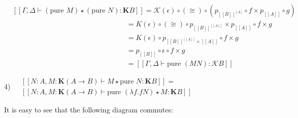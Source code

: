 \documentclass[a4paper]{article}
\begin{document}
\vspace{\baselineskip}

$\begin{array}{lll}
&[\![\Gamma, \Delta \vdash (\text{pure } M) \star (\text{pure } N) : \textbf{K}B]\!] =
\mathcal{K}(\epsilon) \circ (\cong) \circ (p_{[\![B]\!]^{\![A]\!}} \circ f \times p_{[\![A]\!]} \circ g) &\\
&\quad\quad\quad\quad\quad\quad\quad\quad\quad\quad\quad\quad\quad\quad\quad\quad = K(\epsilon) \circ (\cong)
\circ p_{{[\![B]\!]^{[\![A]\!]}}} \times p_{[\![A]\!]} \circ f \times g& \\
&\quad\quad\quad\quad\quad\quad\quad\quad\quad\quad\quad\quad\quad\quad\quad\quad = K(\epsilon) \circ
p_{[\![B]\!]^{[\![A]\!]} \times [\![A]\!]} \circ f \times g& \\
&\quad\quad\quad\quad\quad\quad\quad\quad\quad\quad\quad\quad\quad\quad\quad\quad = p_{[\![B]\!]} \circ \epsilon \circ f \times g& \\
&\quad\quad\quad\quad\quad\quad\quad\quad\quad\quad\quad\quad\quad\quad\quad\quad = [\![\Gamma, \Delta \vdash \text{pure } (M N) : \mathcal{K}B]\!]&
\end{array}$

\vspace{\baselineskip}

\newpage

4) $\begin{array}{lll}
&[\![N : A, M : \textbf{K}(A \to B) \vdash M \star \text{pure } N : \textbf{K}B]\!] =&\\
&[\![N : A, M : \textbf{K}(A \to B) \vdash \text{pure } (\lambda f. f N) \star M : \textbf{K}B]\!]&
\end{array}$

\vspace{\baselineskip}

It is easy to see that the following diagram commutes:

\vspace{\baselineskip}
\end{document}
